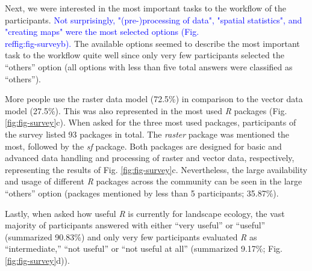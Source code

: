 \documentclass[smallextended]{svjour3}       %
\begin{document}
Next, we were interested in the most important tasks to the workflow of the participants.
\textcolor{blue}{Not surprisingly, "(pre-)processing of data", "spatial statistics", and "creating maps" were the most selected options (Fig. \\ref{fig:fig-survey}b).}
The available options seemed to describe the most important task to the workflow quite well since only very few participants selected the ``others'' option (all options with less than five total answers were classified as ``others'').

More people use the raster data model (72.5\%) in comparison to the vector data model (27.5\%).
This was also represented in the most used \textit{R} packages (Fig. \ref{fig:fig-survey}c).
When asked for the three most used packages, participants of the survey listed 93 packages in total.
The \textit{raster} package was mentioned the most, followed by the \textit{sf} package.
Both packages are designed for basic and advanced data handling and processing of raster and vector data, respectively, representing the results of Fig. \ref{fig:fig-survey}c.
Nevertheless, the large availability and usage of different \textit{R} packages across the community can be seen in the large ``others'' option (packages mentioned by less than 5 participants; 35.87\%).

Lastly, when asked how useful \textit{R} is currently for landscape ecology, the vast majority of participants answered with either ``very useful'' or ``useful'' (summarized 90.83\%) and only very few participants evaluated \textit{R} as ``intermediate,'' ``not useful'' or ``not useful at all'' (summarized 9.17\%; Fig. \ref{fig:fig-survey}d)).
\end{document}
